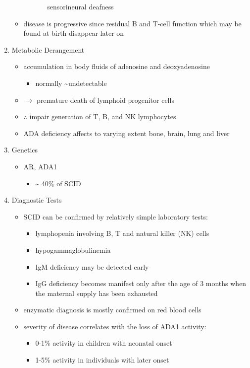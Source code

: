 \documentclass{scrartcl}
\begin{document}
\begin{enumerate}
\begin{itemize}
\begin{itemize}
\begin{itemize}
sensorineural deafness
\end{itemize}
\end{itemize}
\item disease is progressive since residual B and T-cell function which
may be found at birth disappear later on
\end{itemize}
\item Metabolic Derangement
\label{sec:orge7d94f7}
\begin{itemize}
\item accumulation in body fluids of adenosine and deoxyadenosine
\begin{itemize}
\item normally \textasciitilde{}undetectable
\end{itemize}
\end{itemize}
\begin{itemize}
\item \(\to\) premature death of lymphoid progenitor cells
\item \(\therefore\) impair generation of T, B, and NK lymphocytes
\item ADA deficiency affects to varying extent bone, brain, lung and liver
\end{itemize}

\item Genetics
\label{sec:org0bc1461}
\begin{itemize}
\item AR, ADA1
\begin{itemize}
\item \textasciitilde{} 40\% of SCID
\end{itemize}
\end{itemize}

\item Diagnostic Tests
\label{sec:orgf8fc735}
\begin{itemize}
\item SCID can be confirmed by relatively simple laboratory tests:
\begin{itemize}
\item lymphopenia involving B, T and natural killer (NK) cells
\item hypogammaglobulinemia
\item IgM deficiency may be detected early
\item IgG deficiency becomes manifest only after the age of 3 months
when the maternal supply has been exhausted
\end{itemize}
\item enzymatic diagnosis is mostly confirmed on red blood cells
\item severity of disease correlates with the loss of ADA1 activity:
\begin{itemize}
\item 0-1\% activity in children with neonatal onset
\item 1-5\% activity in individuals with later onset
\end{itemize}
\end{itemize}


\end{enumerate}
\end{document}
